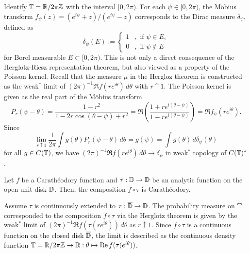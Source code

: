 \documentclass[10pt]{article}
\begin{document}
\begin{ex}
Identify $\mathbb{T}=\mathbb{R}/2\pi\mathbb{Z}$ with the interval $[0,2\pi)$.
For each $\psi\in[0,2\pi)$, the M\"obius transform $f_\psi(z)=(e^{i\psi}+z)/(e^{i\psi}-z)$ corresponds to the Dirac measure $\delta_\psi$, defined as
\[\delta_\psi(E):=\begin{cases}1&,\text{ if }\psi\in E,\\0&,\text{ if }\psi\notin E\end{cases}\]
for Borel measurable $E\subset[0,2\pi)$.
This is not only a direct consequence of the Herglotz-Riesz representation theorem, but also viewed as a property of the Poisson kernel.
Recall that the measure $\mu$ in the Hergloz theorem is constructed as the weak$^*$ limit of $(2\pi)^{-1}\Re f(re^{i\theta})\,d\theta$ with $r\uparrow1$.
The Poisson kernel is given as the real part of the M\"obius transform
\[P_r(\psi-\theta)=\frac{1-r^2}{1-2r\cos(\theta-\psi)+r^2}=\Re\left(\frac{1+re^{i(\theta-\psi)}}{1-re^{i(\theta-\psi)}}\right)=\Re f_\psi(re^{i\theta}).\]
Since
\[\lim_{r\uparrow1}\frac1{2\pi}\int g(\theta)P_r(\psi-\theta)\,d\theta=g(\psi)=\int g(\theta)\,d\delta_\psi(\theta)\]
for all $g\in C(\mathbb{T})$, we have $(2\pi)^{-1}\Re f(re^{i\theta})\,d\theta\to\delta_\psi$ in weak$^*$ topology of $C(\mathbb{T})^*$.
\end{ex}


\begin{ex}
Let $f$ be a Carath\'eodory function and $\tau:\mathbb{D}\to\mathbb{D}$ be an analytic function on the open unit disk $\mathbb{D}$.
Then, the composition $f\circ\tau$ is Carath\'eodory.

Assume $\tau$ is continuously extended to $\tau:\overline{\mathbb{D}}\to\mathbb{D}$.
The probability measure on $\mathbb{T}$ corresponded to the composition $f\circ\tau$ via the Herglotz theorem is given by the weak$^*$ limit of $(2\pi)^{-1}\Re f(\tau(re^{i\theta}))\,d\theta$ as $r\uparrow1$.
Since $f\circ\tau$ is a continuous function on the closed disk $\overline{\mathbb{D}}$, the limit is described as the continuous density function $\mathbb{T}=\mathbb{R}/2\pi\mathbb{Z}\to\mathbb{R}:\theta\mapsto\operatorname{Re} f(\tau(e^{i\theta}))$.
\end{ex}
\end{document}
